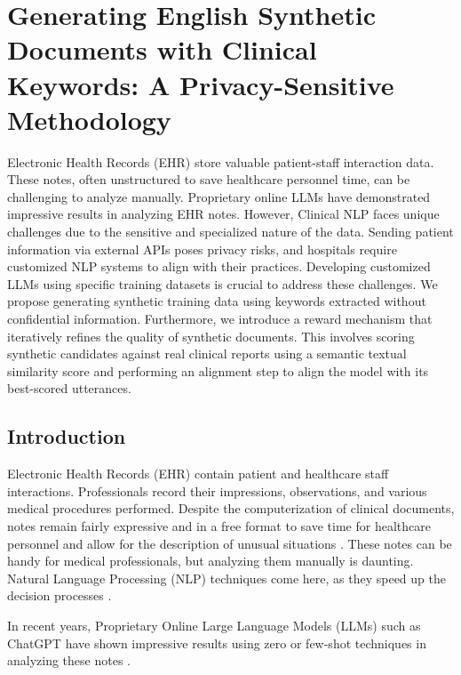 \chapter{Generating English Synthetic Documents with Clinical Keywords: A Privacy-Sensitive Methodology}

Electronic Health Records (EHR) store valuable patient-staff interaction data. These notes, often unstructured to save healthcare personnel time, can be challenging to analyze manually. Proprietary online LLMs have demonstrated impressive results in analyzing EHR notes. However, Clinical NLP faces unique challenges due to the sensitive and specialized nature of the data. Sending patient information via external APIs poses privacy risks, and hospitals require customized NLP systems to align with their practices. Developing customized LLMs using specific training datasets is crucial to address these challenges. 
We propose generating synthetic training data using keywords extracted without confidential information. Furthermore, we introduce a reward mechanism that iteratively refines the quality of synthetic documents. This involves scoring synthetic candidates against real clinical reports using a semantic textual similarity score and performing an alignment step to align the model with its best-scored utterances.

\section{Introduction}

Electronic Health Records (EHR) contain patient and healthcare staff interactions. Professionals record their impressions, observations, and various medical procedures performed. Despite the computerization of clinical documents, notes remain fairly expressive and in a free format to save time for healthcare personnel and allow for the description of unusual situations \citep{rosenbloomDataClinicalNotes2011,wuSurveyClinicalNatural2022}. These notes can be handy for medical professionals, but analyzing them manually is daunting. Natural Language Processing (NLP) techniques come here, as they speed up the decision processes \cite{zhouDataSifterTextPartiallySynthetic2022,wuSurveyClinicalNatural2022}.

In recent years, Proprietary Online Large Language Models (LLMs) such as ChatGPT have shown impressive results using zero or few-shot techniques in analyzing these notes \cite{agrawal_large_2022, meoniLargeLanguageModels2023, hu_improving_2024}.

